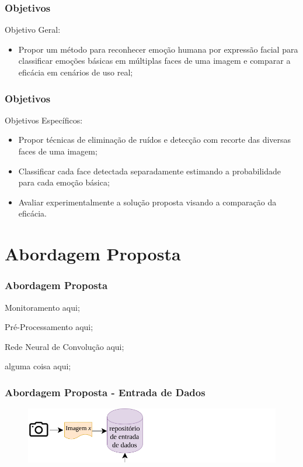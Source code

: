 \documentclass{beamer}
\begin{document}
\begin{frame}
\frametitle{Objetivos}
\begin{block}{Objetivo Geral:}
\begin{itemize}
\pause
\item Propor um método para reconhecer emoção humana por expressão facial para classificar emoções básicas em múltiplas faces de uma imagem e comparar a eficácia em cenários de uso real;
\end{itemize}
\end{block}


\frametitle{Objetivos}
\begin{block}{Objetivos Específicos:}
\begin{itemize}
\pause
 \item Propor técnicas de eliminação de ruídos e detecção com recorte das diversas faces de uma imagem;
 \pause
 \item Classificar cada face detectada separadamente estimando a probabilidade para cada emoção básica;
 \pause
 \item Avaliar experimentalmente a solução proposta visando a comparação da eficácia.
\end{itemize}
\end{block}
\end{frame}



\section{Abordagem Proposta}
\begin{frame}
\frametitle{Abordagem Proposta}
\pause
\begin{block}{Monitoramento}
aqui;
\end{block}
\pause
\begin{block}{Pré-Processamento}
aqui;
\end{block}
\pause
\begin{block}{Rede Neural de Convolução}
aqui;
\end{block}
\begin{block}{alguma coisa}
aqui;
\end{block}

\end{frame}


\begin{frame}
\frametitle{Abordagem Proposta - Entrada de Dados }
\begin{figure}
\centering
\includegraphics[scale=0.37]{figuras/arquitetura_1.png}
\label{fig:arquitetura1}
\end{figure}
\end{frame}
\end{document}
